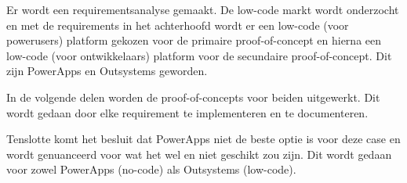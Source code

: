 Er wordt een requirementsanalyse gemaakt. De low-code markt wordt onderzocht en met de requirements in het achterhoofd wordt er een low-code (voor powerusers) platform gekozen voor de primaire proof-of-concept en hierna een low-code (voor ontwikkelaars) platform voor de secundaire proof-of-concept. Dit zijn PowerApps en Outsystems geworden.

In de volgende delen worden de proof-of-concepts voor beiden uitgewerkt. Dit wordt gedaan door elke requirement te implementeren en te documenteren.

Tenslotte komt het besluit dat PowerApps niet de beste optie is voor deze case en wordt genuanceerd voor wat het wel en niet geschikt zou zijn. Dit wordt gedaan voor zowel PowerApps (no-code) als Outsystems (low-code).